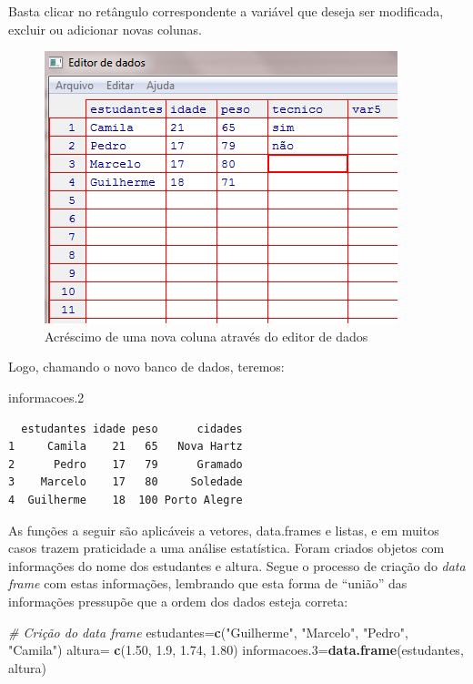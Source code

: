 \documentclass[12pt,brazil,oneside]{book}
\newenvironment{Shaded}{\begin{snugshade}}{\end{snugshade}}
\newcommand{\CommentTok}[1]{\textcolor[rgb]{0.56,0.35,0.01}{\textit{#1}}}
\newcommand{\FloatTok}[1]{\textcolor[rgb]{0.00,0.00,0.81}{#1}}
\newcommand{\KeywordTok}[1]{\textcolor[rgb]{0.13,0.29,0.53}{\textbf{#1}}}
\newcommand{\NormalTok}[1]{#1}
\newcommand{\StringTok}[1]{\textcolor[rgb]{0.31,0.60,0.02}{#1}}
\begin{document}
Basta clicar no retângulo correspondente a variável que deseja ser modificada, excluir ou adicionar novas colunas.

\begin{figure}[H]

{\centering \includegraphics[width=0.8\linewidth]{10} 

}

\caption{Acréscimo de uma nova coluna através do editor de dados}\label{fig:10}
\end{figure}

Logo, chamando o novo banco de dados, teremos:

\begin{Shaded}
\begin{Highlighting}[]
\NormalTok{informacoes}\FloatTok{.2} 
\end{Highlighting}
\end{Shaded}

\begin{verbatim}
  estudantes idade peso      cidades
1     Camila    21   65   Nova Hartz
2      Pedro    17   79      Gramado
3    Marcelo    17   80     Soledade
4  Guilherme    18  100 Porto Alegre
\end{verbatim}

As funções a seguir são aplicáveis a vetores, data.frames e listas, e em muitos casos trazem praticidade a uma análise estatística. Foram criados objetos com informações do nome dos estudantes e altura. Segue o processo de criação do \emph{data frame} com estas informações, lembrando que esta forma de ``união'' das informações pressupõe que a ordem dos dados esteja correta:

\begin{Shaded}
\begin{Highlighting}[]
\CommentTok{# Crição do data frame}
\NormalTok{estudantes=}\KeywordTok{c}\NormalTok{(}\StringTok{"Guilherme"}\NormalTok{, }\StringTok{"Marcelo"}\NormalTok{, }\StringTok{"Pedro"}\NormalTok{, }\StringTok{"Camila"}\NormalTok{)}
\NormalTok{altura=}\StringTok{ }\KeywordTok{c}\NormalTok{(}\FloatTok{1.50}\NormalTok{, }\FloatTok{1.9}\NormalTok{, }\FloatTok{1.74}\NormalTok{, }\FloatTok{1.80}\NormalTok{)}
\NormalTok{informacoes}\FloatTok{.3}\NormalTok{=}\KeywordTok{data.frame}\NormalTok{(estudantes, altura)}
\end{Highlighting}
\end{Shaded}
\end{document}

